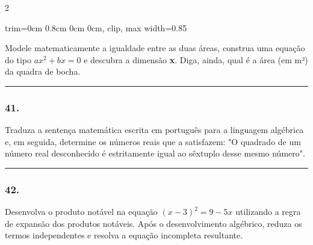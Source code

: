 \documentclass[twoside, 10pt, a4paper]{article}
\newlength{\espacoPreQuestao}\setlength{\espacoPreQuestao}{0.1cm}
\newlength{\espacoQuestao}\setlength{\espacoQuestao}{0.2cm}
\newcommand{\larguraTikz}{0.85\linewidth}
\begin{document}
\begin{multicols*}{2}
\begin{center}
\begin{adjustbox}{trim=0cm 0.8cm 0cm 0cm, clip, max width=\larguraTikz}
\end{adjustbox}
\end{center}

Modele matematicamente a igualdade entre as duas áreas, construa uma equação do tipo $ ax^2 + bx = 0 $ e descubra a dimensão \textbf{x}. Diga, ainda, qual é a área (em m²) da quadra de bocha.
\par\vspace{\espacoQuestao}

\noindent\textcolor{CorLinha}{\rule{\linewidth}{0.5pt}} 
\par\vspace{\espacoPreQuestao}
\subsubsection*{41.} Traduza a sentença matemática escrita em português para a linguagem algébrica e, em seguida, determine os números reais que a satisfazem: "O quadrado de um número real desconhecido é estritamente igual ao sêxtuplo desse mesmo número".
\par\vspace{\espacoQuestao}

\noindent\textcolor{CorLinha}{\rule{\linewidth}{0.5pt}} 
\par\vspace{\espacoPreQuestao}
\subsubsection*{42.} Desenvolva o produto notável na equação $ (x - 3)^2 = 9 - 5x $ utilizando a regra de expansão dos produtos notáveis. Após o desenvolvimento algébrico, reduza os termos independentes e resolva a equação incompleta resultante.
\par\vspace{\espacoQuestao}


\end{multicols*}
\end{document}
